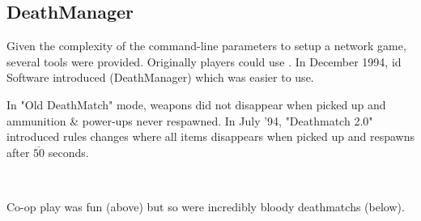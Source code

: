 \subsection{DeathManager}
Given the complexity of the command-line parameters to setup a network game, several tools were provided. Originally players could use . In December 1994, id Software introduced  (DeathManager) which was easier to use.\\
\par
{}
\par
\vspace{-10pt}
In "Old DeathMatch" mode, weapons did not disappear when picked up and ammunition \& power-ups never respawned. In July '94, "Deathmatch 2.0" introduced rules changes where all items disappears when picked up and respawns after $\overline{50}$ seconds.\\
\par












\\
\par
Co-op play was fun (above) but so were incredibly bloody deathmatchs (below).\\
\par
{}


